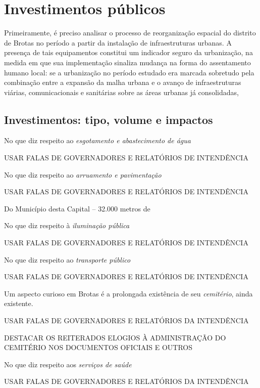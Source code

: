 \section{Investimentos públicos}\label{sec:3.1}

Primeiramente, é preciso analisar o processo de reorganização espacial do distrito de Brotas no período a partir da instalação de infraestruturas urbanas. A presença de tais equipamentos constitui um indicador seguro da urbanização, na medida em que sua implementação sinaliza mudança na forma do assentamento humano local: se a urbanização no período estudado era marcada sobretudo pela combinação entre a expansão da malha urbana e o avanço de infraestruturas viárias, comunicacionais e sanitárias sobre as áreas urbanas já consolidadas, 

\subsection{Investimentos: tipo, volume e impactos}\label{investbrotas}

No que diz respeito ao \textit{esgotamento e abastecimento de água}

USAR FALAS DE GOVERNADORES E RELATÓRIOS DE INTENDÊNCIA

No que diz respeito ao \textit{arruamento e pavimentação}

USAR FALAS DE GOVERNADORES E RELATÓRIOS DE INTENDÊNCIA

\begin{citacao}
Do Município desta Capital -- 32.000 metros de 
\end{citacao}

No que diz respeito à \textit{iluminação pública}

USAR FALAS DE GOVERNADORES E RELATÓRIOS DE INTENDÊNCIA

No que diz respeito ao \textit{transporte público}

USAR FALAS DE GOVERNADORES E RELATÓRIOS DE INTENDÊNCIA

Um aspecto curioso em Brotas é a prolongada existência de seu \textit{cemitério}, ainda existente.

USAR FALAS DE GOVERNADORES E RELATÓRIOS DA INTENDÊNCIA

DESTACAR OS REITERADOS ELOGIOS À ADMINISTRAÇÃO DO CEMITÉRIO NOS DOCUMENTOS OFICIAIS E OUTROS

No que diz respeito aos \textit{serviços de saúde}

USAR FALAS DE GOVERNADORES E RELATÓRIOS DA INTENDÊNCIA

